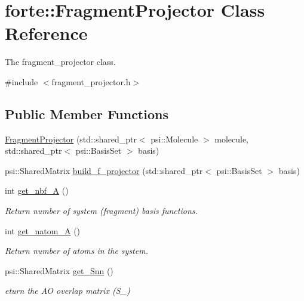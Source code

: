 \hypertarget{classforte_1_1_fragment_projector}{}\section{forte\+:\+:Fragment\+Projector Class Reference}
\label{classforte_1_1_fragment_projector}


The fragment\+\_\+projector class.  




{\ttfamily \#include $<$fragment\+\_\+projector.\+h$>$}

\subsection*{Public Member Functions}
\begin{DoxyCompactItemize}
\item 
\mbox{\hyperlink{classforte_1_1_fragment_projector_aa66efdff21a75ad8f77beb72c166a45c}{Fragment\+Projector}} (std\+::shared\+\_\+ptr$<$ psi\+::\+Molecule $>$ molecule, std\+::shared\+\_\+ptr$<$ psi\+::\+Basis\+Set $>$ basis)
\item 
psi\+::\+Shared\+Matrix \mbox{\hyperlink{classforte_1_1_fragment_projector_aae8790c8c1aefadaedf74007ffc459bc}{build\+\_\+f\+\_\+projector}} (std\+::shared\+\_\+ptr$<$ psi\+::\+Basis\+Set $>$ basis)
\item 
int \mbox{\hyperlink{classforte_1_1_fragment_projector_a1ff48ecdfc4013f9e0d9a0aa9eb640f4}{get\+\_\+nbf\+\_\+A}} ()
\begin{DoxyCompactList}\small\item\em Return number of system (fragment) basis functions. \end{DoxyCompactList}\item 
int \mbox{\hyperlink{classforte_1_1_fragment_projector_a76c6011302d2d34bcd0672b8e67059d5}{get\+\_\+natom\+\_\+A}} ()
\begin{DoxyCompactList}\small\item\em Return number of atoms in the system. \end{DoxyCompactList}\item 
psi\+::\+Shared\+Matrix \mbox{\hyperlink{classforte_1_1_fragment_projector_af10a8be1ee4d53333f1832eaa8097f5f}{get\+\_\+\+Snn}} ()
\begin{DoxyCompactList}\small\item\em eturn the AO overlap matrix (S\+\_\+) \end{DoxyCompactList}\end{DoxyCompactItemize}


